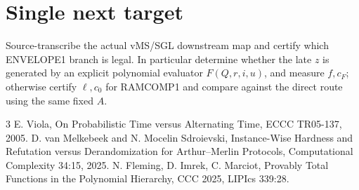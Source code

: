 \documentclass[11pt]{article}
\begin{document}
\section*{Single next target}
Source-transcribe the actual vMS/SGL downstream map and certify which ENVELOPE1 branch is legal. In particular determine whether the late $z$ is generated by an explicit polynomial evaluator $F(Q,r,i,u)$, and measure $f,c_F$; otherwise certify $\ell,c_0$ for RAMCOMP1 and compare against the direct route using the same fixed $A$.
\begin{thebibliography}{3}
 E. Viola, On Probabilistic Time versus Alternating Time, ECCC TR05-137, 2005.
 D. van Melkebeek and N. Mocelin Sdroievski, Instance-Wise Hardness and Refutation versus Derandomization for Arthur--Merlin Protocols, Computational Complexity 34:15, 2025.
 N. Fleming, D. Imrek, C. Marciot, Provably Total Functions in the Polynomial Hierarchy, CCC 2025, LIPIcs 339:28.
\end{thebibliography}
\end{document}
